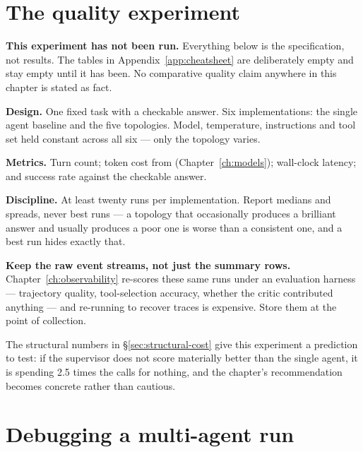 \section{The quality experiment}
\label{sec:quality-experiment}

\begin{warning}
\textbf{This experiment has not been run.} Everything below is the specification,
not results. The tables in Appendix~\ref{app:cheatsheet} are deliberately empty
and stay empty until it has been. No comparative quality claim anywhere in this
chapter is stated as fact.
\end{warning}

\textbf{Design.} One fixed task with a checkable answer. Six implementations: the
single agent baseline and the five topologies. Model, temperature, instructions
and tool set held constant across all six --- only the topology varies.

\textbf{Metrics.} Turn count; token cost from 
(Chapter~\ref{ch:models}); wall-clock latency; and success rate against the
checkable answer.

\textbf{Discipline.} At least twenty runs per implementation. Report medians and
spreads, never best runs --- a topology that occasionally produces a brilliant
answer and usually produces a poor one is worse than a consistent one, and a best
run hides exactly that.

\begin{note}
\textbf{Keep the raw event streams, not just the summary rows.}
Chapter~\ref{ch:observability} re-scores these same runs under an evaluation
harness --- trajectory quality, tool-selection accuracy, whether the critic
contributed anything --- and re-running to recover traces is expensive. Store
them at the point of collection.

The structural numbers in \S\ref{sec:structural-cost} give this experiment a
prediction to test: if the supervisor does not score materially better than the
single agent, it is spending 2.5 times the calls for nothing, and the chapter's
recommendation becomes concrete rather than cautious.
\end{note}

\section{Debugging a multi-agent run}
\label{sec:debugging-multi-agent}

